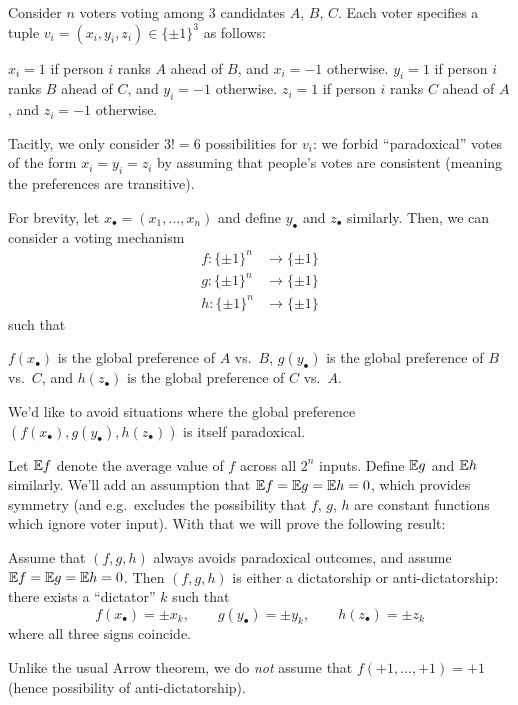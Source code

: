 Consider $n$ voters voting among $3$ candidates $A$, $B$, $C$.
Each voter specifies a tuple $v_i = (x_i, y_i, z_i) \in \{\pm1\}^3$ as follows:
\begin{itemize}
	\ii $x_i = 1$ if person $i$ ranks $A$ ahead of $B$, and $x_i = -1$ otherwise.
	\ii $y_i = 1$ if person $i$ ranks $B$ ahead of $C$, and $y_i = -1$ otherwise.
	\ii $z_i = 1$ if person $i$ ranks $C$ ahead of $A$, and $z_i = -1$ otherwise.
\end{itemize}
Tacitly, we only consider $3! = 6$ possibilities for $v_i$:
we forbid ``paradoxical'' votes of the form $x_i = y_i = z_i$
by assuming that people's votes are consistent
(meaning the preferences are transitive).


For brevity, let $x_\bullet = (x_1, \dots, x_n)$
and define $y_\bullet$ and $z_\bullet$ similarly.
Then, we can consider a voting mechanism
\begin{align*}
	f \colon \{\pm1\}^n &\to \{\pm1\} \\
	g \colon \{\pm1\}^n &\to \{\pm1\} \\
	h \colon \{\pm1\}^n &\to \{\pm1\}
\end{align*}
such that
\begin{itemize}
	\ii $f(x_\bullet)$ is the global preference of $A$ vs.\ $B$,
	\ii $g(y_\bullet)$ is the global preference of $B$ vs.\ $C$,
	\ii and $h(z_\bullet)$ is the global preference of $C$ vs.\ $A$.
\end{itemize}
We'd like to avoid situations where the global preference
$(f(x_\bullet), g(y_\bullet), h(z_\bullet))$ is itself paradoxical.

Let $\mathbb E f$ denote the average value of $f$ across all $2^n$ inputs.
Define $\mathbb E g$ and $\mathbb E h$ similarly.
We'll add an assumption that $\mathbb E f = \mathbb E g = \mathbb E h = 0$,
which provides symmetry
(and e.g.\ excludes the possibility that $f$, $g$, $h$
are constant functions which ignore voter input).
With that we will prove the following result:
\begin{theorem}
	Assume that $(f,g,h)$ always avoids paradoxical outcomes,
	and assume $\mathbb E f = \mathbb E g = \mathbb E h = 0$.
	Then $(f,g,h)$ is either a dictatorship or anti-dictatorship:
	there exists a ``dictator'' $k$ such that
	\[ f(x_\bullet) = \pm x_k, \qquad g(y_\bullet) = \pm y_k,
		\qquad h(z_\bullet) = \pm z_k \]
	where all three signs coincide.
\end{theorem}
Unlike the usual Arrow theorem, we do \emph{not} assume
that $f(+1, \dots, +1) = +1$ (hence possibility of anti-dictatorship).

